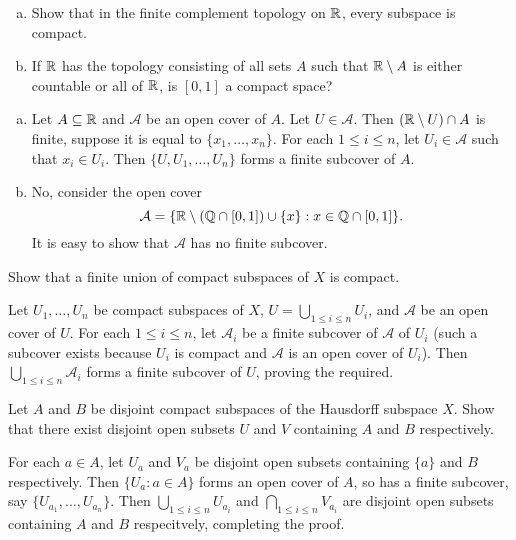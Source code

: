 	\begin{exercise}
	\phantom{bah}
		\begin{enumerate}[(a)]
			\item Show that in the finite complement topology on $\mathbb{R}$, every subspace is compact. 
			\item If $\mathbb{R}$ has the topology consisting of all sets $A$ such that $\mathbb{R}\setminus A$ is either countable or all of $\mathbb{R}$, is $[0,1]$ a compact space?
		\end{enumerate}
	\end{exercise}
	\begin{solution*}
		\begin{enumerate}[(a)]
			\item Let $A\subseteq\mathbb{R}$ and $\mathcal{A}$ be an open cover of $A$. Let $U\in\mathcal{A}$. Then $(\mathbb{R}\setminus U)\cap A$ is finite, suppose it is equal to $\{x_1,\ldots,x_n\}$. For each $1\leq i\leq n$, let $U_i\in\mathcal{A}$ such that $x_i\in U_i$. Then $\{U,U_1,\ldots,U_n\}$ forms a finite subcover of $A$.
			\item No, consider the open cover
			\[ \mathcal{A} = \{ \mathbb{R}\setminus (\mathbb{Q}\cap[0,1]) \cup\{x\} : x\in \mathbb{Q}\cap[0,1] \}. \]
			It is easy to show that $\mathcal{A}$ has no finite subcover.
		\end{enumerate}
	\end{solution*}

	\begin{exercise}
		Show that a finite union of compact subspaces of $X$ is compact.
	\end{exercise}
	\begin{solution*}
		Let $U_1,\ldots,U_n$ be compact subspaces of $X$, $U = \bigcup_{1\leq i\leq n} U_i$, and $\mathcal{A}$ be an open cover of $U$. For each $1\leq i\leq n$, let $\mathcal{A}_i$ be a finite subcover of $\mathcal{A}$ of $U_i$ (such a subcover exists because $U_i$ is compact and $\mathcal{A}$ is an open cover of $U_i$). Then $\bigcup_{1\leq i\leq n}\mathcal{A}_i$ forms a finite subcover of $U$, proving the required.
	\end{solution*}

	\setcounter{exercise}{4}
	\begin{exercise}
		Let $A$ and $B$ be disjoint compact subspaces of the Hausdorff subspace $X$. Show that there exist disjoint open subsets $U$ and $V$ containing $A$ and $B$ respectively.
	\end{exercise}
	\begin{solution*}
		For each $a\in A$, let $U_a$ and $V_a$ be disjoint open subsets containing $\{a\}$ and $B$ respectively. Then $\{U_a : a\in A\}$ forms an open cover of $A$, so has a finite subcover, say $\{U_{a_1},\ldots,U_{a_n}\}$. Then $\bigcup_{1\leq i\leq n} U_{a_i}$ and $\bigcap_{1\leq i\leq n} V_{a_i}$ are disjoint open subsets containing $A$ and $B$ respecitvely, completing the proof.
	\end{solution*}
	
